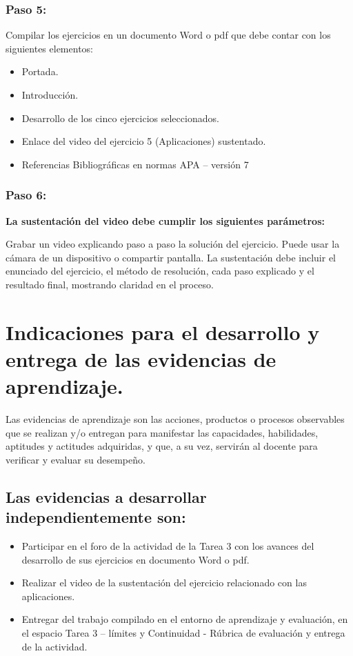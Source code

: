 \documentclass[12pt,letterpaper]{article}
\begin{document}
\subsubsection*{Paso 5:}

Compilar los ejercicios en un documento Word o pdf que debe contar con los siguientes elementos:

\begin{itemize}
\item Portada.
\item Introducción.
\item Desarrollo de los cinco ejercicios seleccionados.
\item Enlace del video del ejercicio 5 (Aplicaciones) sustentado.
\item Referencias Bibliográficas en normas APA -- versión 7
\end{itemize}

\subsubsection*{Paso 6:}

\textbf{La sustentación del video debe cumplir los siguientes parámetros:}

Grabar un video explicando paso a paso la solución del ejercicio. Puede usar la cámara de un dispositivo o compartir pantalla. La sustentación debe incluir el enunciado del ejercicio, el método de resolución, cada paso explicado y el resultado final, mostrando claridad en el proceso.

\section{Indicaciones para el desarrollo y entrega de las evidencias de aprendizaje.}

Las evidencias de aprendizaje son las acciones, productos o procesos observables que se realizan y/o entregan para manifestar las capacidades, habilidades, aptitudes y actitudes adquiridas, y que, a su vez, servirán al docente para verificar y evaluar su desempeño.

\subsection*{Las evidencias a desarrollar independientemente son:}

\begin{itemize}
\item Participar en el foro de la actividad de la Tarea 3 con los avances del desarrollo de sus ejercicios en documento Word o pdf.
\item Realizar el video de la sustentación del ejercicio relacionado con las aplicaciones.
\item Entregar del trabajo compilado en el entorno de aprendizaje y evaluación, en el espacio Tarea 3 -- límites y Continuidad - Rúbrica de evaluación y entrega de la actividad.
\end{itemize}
\end{document}
